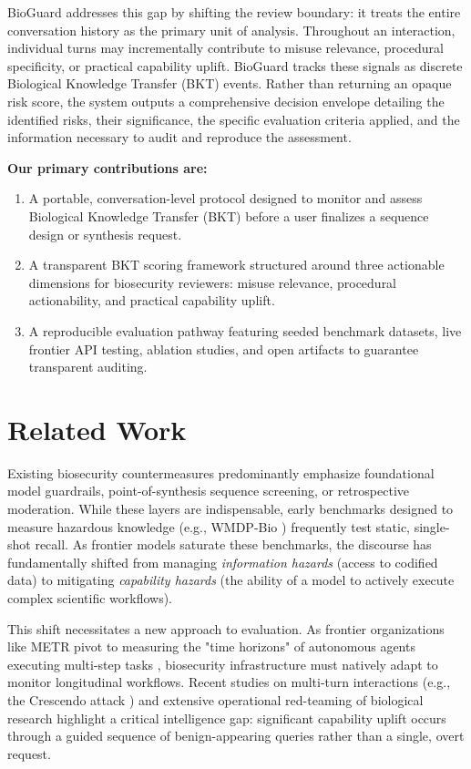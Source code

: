 \documentclass[11pt]{article}
\begin{document}
BioGuard addresses this gap by shifting the review boundary: it treats the entire conversation history as the primary unit of analysis. Throughout an interaction, individual turns may incrementally contribute to misuse relevance, procedural specificity, or practical capability uplift. BioGuard tracks these signals as discrete Biological Knowledge Transfer (BKT) events. Rather than returning an opaque risk score, the system outputs a comprehensive decision envelope detailing the identified risks, their significance, the specific evaluation criteria applied, and the information necessary to audit and reproduce the assessment.

\textbf{Our primary contributions are:}
\begin{enumerate}[label=\arabic*.]
    \item A portable, conversation-level protocol designed to monitor and assess Biological Knowledge Transfer (BKT) before a user finalizes a sequence design or synthesis request.
    \item A transparent BKT scoring framework structured around three actionable dimensions for biosecurity reviewers: misuse relevance, procedural actionability, and practical capability uplift.
    \item A reproducible evaluation pathway featuring seeded benchmark datasets, live frontier API testing, ablation studies, and open artifacts to guarantee transparent auditing.
\end{enumerate}

\section{Related Work}

Existing biosecurity countermeasures predominantly emphasize foundational model guardrails, point-of-synthesis sequence screening, or retrospective moderation. While these layers are indispensable, early benchmarks designed to measure hazardous knowledge (e.g., WMDP-Bio \cite{Li2024}) frequently test static, single-shot recall. As frontier models saturate these benchmarks, the discourse has fundamentally shifted from managing \textit{information hazards} (access to codified data) to mitigating \textit{capability hazards} (the ability of a model to actively execute complex scientific workflows).

This shift necessitates a new approach to evaluation. As frontier organizations like METR pivot to measuring the "time horizons" of autonomous agents executing multi-step tasks \cite{Kwa2025}, biosecurity infrastructure must natively adapt to monitor longitudinal workflows. Recent studies on multi-turn interactions (e.g., the Crescendo attack \cite{Russinovich2024}) and extensive operational red-teaming of biological research \cite{Mouton2024} highlight a critical intelligence gap: significant capability uplift occurs through a guided sequence of benign-appearing queries rather than a single, overt request. 
\end{document}
